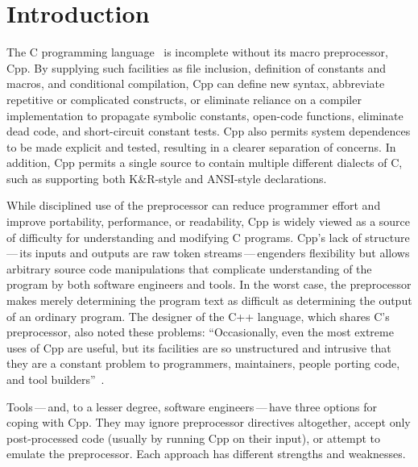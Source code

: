 \documentclass[10pt]{article}
\begin{document}
\bigskip

\section{Introduction}

The C programming language~\cite{KernighanR88,Harbison91} is incomplete
without its macro preprocessor, Cpp.  By supplying such facilities as file
inclusion, definition of constants and macros, and conditional compilation,
Cpp can define new syntax, abbreviate repetitive or complicated constructs,
or eliminate reliance on a compiler implementation to propagate symbolic
constants, open-code functions, eliminate dead code, and short-circuit
constant tests.  Cpp also permits system dependences to be made explicit
and tested, resulting in a clearer separation of concerns.  In addition,
Cpp permits a single source to contain multiple different dialects of C,
such as supporting both K\&R-style and ANSI-style declarations.


While disciplined use of the preprocessor can reduce programmer effort
and improve portability, performance, or readability, Cpp is widely
viewed as a source of difficulty for understanding and modifying C
programs.  Cpp's lack of structure\,---\,its inputs and
outputs are raw token streams\,---\,engenders flexibility but allows
arbitrary source code manipulations that complicate 
understanding of the program by both software engineers and tools.  In
the worst case, the preprocessor makes merely determining the program
text as difficult as determining the output of an ordinary program.
The designer of the C++ language, which shares C's preprocessor, also noted these
problems: ``Occasionally, even the most extreme uses of Cpp are
useful, but its facilities are so unstructured and intrusive that they
are a constant problem to programmers, maintainers, people porting
code, and tool builders''~\cite[p.~424]{Stroustrup-DesignEvolution}.

Tools\,---\,and, to a lesser degree, software engineers\,---\,have
three options for coping with Cpp.  They may ignore preprocessor
directives altogether, accept only post-processed code (usually by
running Cpp on their input), or attempt to emulate the preprocessor.
Each approach has different strengths and weaknesses.
\end{document}
